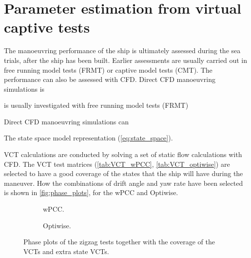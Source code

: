 \section{Parameter estimation from virtual captive tests} \label{sec:VCT}
The manoeuvring performance of the ship is ultimately assessed during the sea trials, after the ship has been built. Earlier assessments are usually carried out in free running model tests (FRMT) or captive model tests (CMT). The performance can also be assessed with CFD. Direct CFD manoeuvring simulations is \cite{} 

is usually investigated with free running model tests (FRMT)  

Direct CFD manoeuvring simulations can 

The state space model representation (\autoref{eq:state_space}).




VCT calculations are conducted by solving a set of static flow calculations with CFD. The VCT test matrices (\autoref{tab:VCT_wPCC}, \autoref{tab:VCT_optiwise}) are selected to have a good coverage of the states that the ship will have during the maneuver. How the combinations of drift angle and yaw rate have been selected is shown in \autoref{fig:phase_plots}, for the wPCC and Optiwise. 
\begin{figure}[h]
     \centering
     \begin{subfigure}[b]{0.49\textwidth}
         \centering
         
        \caption{wPCC.}
        \label{fig:VCT_phase_plot_wPCC}
     \end{subfigure}
     \hfill
     \begin{subfigure}[b]{0.49\textwidth}
        \centering
        
        \caption{Optiwise.}
        \label{fig:VCT_phase_plot_optiwise}
     \end{subfigure}
        \caption{Phase plots of the zigzag tests together with the coverage of the VCTs and extra state VCTs.}
        \label{fig:phase_plots}
\end{figure}

